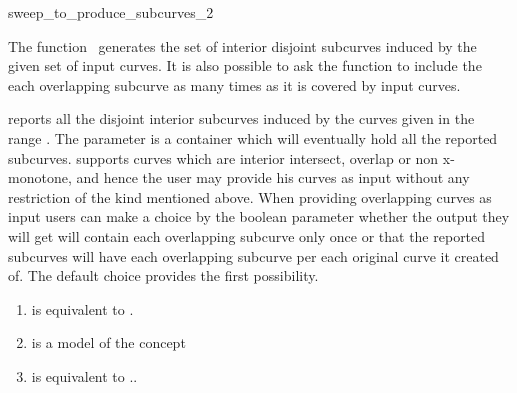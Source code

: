 

\begin{ccRefFunction}{sweep_to_produce_subcurves_2}  %


\ccDefinition

The function \ccRefName\ generates the set of interior disjoint
subcurves induced by the given set of input curves. It is also
possible to ask the function to include the each overlapping subcurve
as many times as it is covered by input curves.

\def\ccLongParamLayout{\ccTrue} 

   {reports all the disjoint interior subcurves induced by the curves
   given in the range \ccStyle{[curves_begin, curves_end)}. The
   parameter  is a container which will eventually
   hold all the reported
   subcurves.  supports
   curves which are interior intersect, overlap or non x-monotone, and
   hence the user may provide his curves as input without any
   restriction of the kind mentioned above. When providing overlapping
   curves as input users can make a choice by the boolean parameter
    whether the output they will get will contain
   each overlapping subcurve only once or that the reported subcurves
   will have each overlapping subcurve per each original curve it
   created of. The default choice provides the first possibility.}

\begin{enumerate}
   \item    {} is equivalent to .
   \item    {} is a model of the  concept
   \item    {} is equivalent to ..
\end{enumerate}


\end{ccRefFunction}
